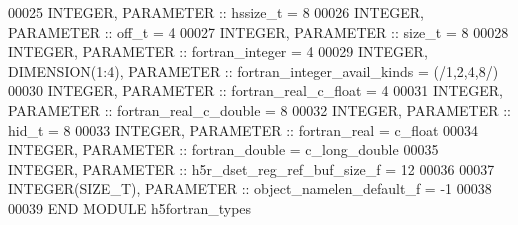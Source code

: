 \begin{DoxyCode}
00025         \textcolor{keywordtype}{INTEGER}, \textcolor{keywordtype}{PARAMETER} :: hssize\_t = 8
00026         \textcolor{keywordtype}{INTEGER}, \textcolor{keywordtype}{PARAMETER} :: off\_t = 4
00027         \textcolor{keywordtype}{INTEGER}, \textcolor{keywordtype}{PARAMETER} :: size\_t = 8
00028         \textcolor{keywordtype}{INTEGER}, \textcolor{keywordtype}{PARAMETER} :: fortran\_integer = 4
00029         \textcolor{keywordtype}{INTEGER}, \textcolor{keywordtype}{DIMENSION(1:4)}, \textcolor{keywordtype}{PARAMETER} :: fortran\_integer\_avail\_kinds = (/1,2,4,8/)
00030         \textcolor{keywordtype}{INTEGER}, \textcolor{keywordtype}{PARAMETER} :: fortran\_real\_c\_float = 4
00031         \textcolor{keywordtype}{INTEGER}, \textcolor{keywordtype}{PARAMETER} :: fortran\_real\_c\_double = 8
00032         \textcolor{keywordtype}{INTEGER}, \textcolor{keywordtype}{PARAMETER} :: hid\_t = 8
00033         \textcolor{keywordtype}{INTEGER}, \textcolor{keywordtype}{PARAMETER} :: fortran\_real = c\_float
00034         \textcolor{keywordtype}{INTEGER}, \textcolor{keywordtype}{PARAMETER} :: fortran\_double = c\_long\_double
00035         \textcolor{keywordtype}{INTEGER}, \textcolor{keywordtype}{PARAMETER} :: h5r\_dset\_reg\_ref\_buf\_size\_f = 12
00036 
00037         \textcolor{keywordtype}{INTEGER(SIZE\_T)}, \textcolor{keywordtype}{PARAMETER} :: object\_namelen\_default\_f = -1
00038 
00039 \textcolor{keyword}{        END MODULE }h5fortran\_types
\end{DoxyCode}
